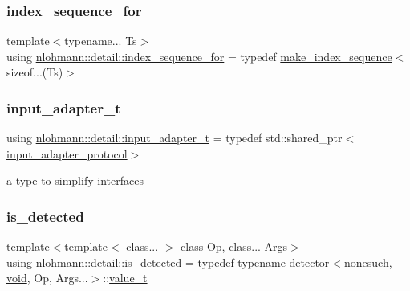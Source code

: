 \mbox{\label{namespacenlohmann_1_1detail_a24800493c6ec02ce033dcbb47b7fd28e}} 
\subsubsection{\texorpdfstring{index\+\_\+sequence\+\_\+for}{index\_sequence\_for}}
{\footnotesize\ttfamily template$<$typename... Ts$>$ \\
using \hyperlink{namespacenlohmann_1_1detail_a24800493c6ec02ce033dcbb47b7fd28e}{nlohmann\+::detail\+::index\+\_\+sequence\+\_\+for} = typedef \hyperlink{structnlohmann_1_1detail_1_1make__index__sequence}{make\+\_\+index\+\_\+sequence}$<$sizeof...(Ts)$>$}

\mbox{\label{namespacenlohmann_1_1detail_ae132f8cd5bb24c5e9b40ad0eafedf1c2}} 
\subsubsection{\texorpdfstring{input\+\_\+adapter\+\_\+t}{input\_adapter\_t}}
{\footnotesize\ttfamily using \hyperlink{namespacenlohmann_1_1detail_ae132f8cd5bb24c5e9b40ad0eafedf1c2}{nlohmann\+::detail\+::input\+\_\+adapter\+\_\+t} = typedef std\+::shared\+\_\+ptr$<$\hyperlink{structnlohmann_1_1detail_1_1input__adapter__protocol}{input\+\_\+adapter\+\_\+protocol}$>$}



a type to simplify interfaces 

\mbox{\label{namespacenlohmann_1_1detail_a9135fcf616d6ac6e231a86e0a055ac44}} 
\subsubsection{\texorpdfstring{is\+\_\+detected}{is\_detected}}
{\footnotesize\ttfamily template$<$template$<$ class... $>$ class Op, class... Args$>$ \\
using \hyperlink{namespacenlohmann_1_1detail_a9135fcf616d6ac6e231a86e0a055ac44}{nlohmann\+::detail\+::is\+\_\+detected} = typedef typename \hyperlink{structnlohmann_1_1detail_1_1detector}{detector}$<$\hyperlink{structnlohmann_1_1detail_1_1nonesuch}{nonesuch}, \hyperlink{namespacenlohmann_1_1detail_a59fca69799f6b9e366710cb9043aa77d}{void}, Op, Args...$>$\+::\hyperlink{namespacenlohmann_1_1detail_a1ed8fc6239da25abcaf681d30ace4985}{value\+\_\+t}}

